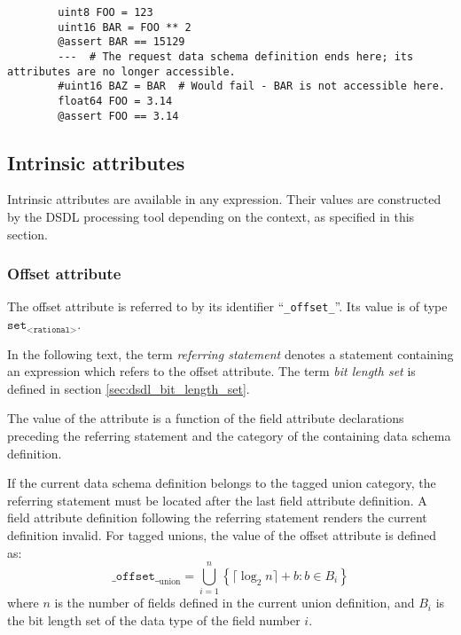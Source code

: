 \begin{remark}
    \begin{verbatim}
        uint8 FOO = 123
        uint16 BAR = FOO ** 2
        @assert BAR == 15129
        ---  # The request data schema definition ends here; its attributes are no longer accessible.
        #uint16 BAZ = BAR  # Would fail - BAR is not accessible here.
        float64 FOO = 3.14
        @assert FOO == 3.14
    \end{verbatim}
\end{remark}

\subsection{Intrinsic attributes}

Intrinsic attributes are available in any expression.
Their values are constructed by the DSDL processing tool depending on the context,
as specified in this section.

\subsubsection{Offset attribute}

The offset attribute is referred to by its identifier ``\verb|_offset_|''.
Its value is of type $\texttt{set}_\texttt{<rational>}$.

In the following text, the term \emph{referring statement} denotes a statement
containing an expression which refers to the offset attribute.
The term \emph{bit length set} is defined in section \ref{sec:dsdl_bit_length_set}.

The value of the attribute is a function of the field attribute declarations preceding the referring statement
and the category of the containing data schema definition.

If the current data schema definition belongs to the tagged union category,
the referring statement must be located after the last field attribute definition.
A field attribute definition following the referring statement renders the current definition invalid.
For tagged unions, the value of the offset attribute is defined as:
$$
    \texttt{\_offset\_}_\text{union} =
    \bigcup\limits_{i=1}^{n}
    \left\{ \lceil{}\log_2 n\rceil{} + b : b \in B_i \right\}
$$
where $n$ is the number of fields defined in the current union definition,
and $B_i$ is the bit length set of the data type of the field number $i$.

